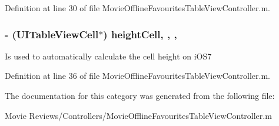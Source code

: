 Definition at line 30 of file Movie\+Offline\+Favourites\+Table\+View\+Controller.\+m.

\subsubsection[{height\+Cell}]{\setlength{\rightskip}{0pt plus 5cm}-\/ (U\+I\+Table\+View\+Cell$\ast$) height\+Cell\hspace{0.3cm}{\ttfamily [read]}, {\ttfamily [write]}, {\ttfamily [nonatomic]}, {\ttfamily [strong]}}\label{category_movie_offline_favourites_table_view_controller_07_08_a500eaa00946e47be8fb6ede96da8ab2c}
Is used to automatically calculate the cell height on i\+O\+S7 

Definition at line 36 of file Movie\+Offline\+Favourites\+Table\+View\+Controller.\+m.



The documentation for this category was generated from the following file\+:\begin{DoxyCompactItemize}
\item 
Movie Reviews/\+Controllers/Movie\+Offline\+Favourites\+Table\+View\+Controller.\+m\end{DoxyCompactItemize}
